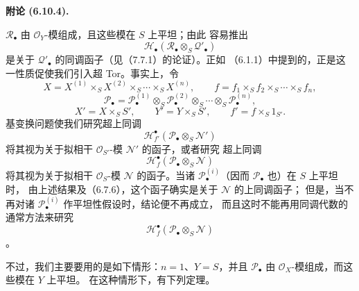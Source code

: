 \documentclass[UTF8,fontset=none,11pt,oneside,openany]{ctexbook}
\newenvironment{scholium}[1][]{%
  \par\medskip\noindent\textbf{附论 (#1).}\ %
}{\par}
\begin{document}
\begin{scholium}[6.10.4]
$\mathscr R_\bullet$ 由 $\mathscr O_Y$-模组成，且这些模在 $S$ 上平坦；由此
容易推出
\[
  \mathscr H_\bullet
  (\mathscr R_\bullet\otimes_S\mathscr Q'_\bullet)
\]
是关于 $\mathscr Q'_\bullet$ 的同调函子（见（7.7.1）的论证）。正如
（6.1.1）中提到的，正是这一性质促使我们引入超 Tor。事实上，令
\[
  X=X^{(1)}\times_SX^{(2)}\times_S\cdots\times_SX^{(n)},
  \qquad
  f=f_1\times_Sf_2\times_S\cdots\times_Sf_n,
\]
\[
  \mathscr P_\bullet
  =
  \mathscr P_\bullet^{(1)}
  \otimes_S\mathscr P_\bullet^{(2)}
  \otimes_S\cdots\otimes_S\mathscr P_\bullet^{(n)},
\]
\[
  X'=X\times_SS',
  \qquad
  Y'=Y\times_SS',
  \qquad
  f'=f\times_S1_{S'}.
\]
基变换问题使我们研究超上同调
\[
  \mathscr H^\bullet_{f'}
  (\mathscr P_\bullet\otimes_S\mathscr N')
\]
将其视为关于拟相干 $\mathscr O_{S'}$-模 $\mathscr N'$ 的函子，或者研究
超上同调
\[
  \mathscr H^\bullet_f
  (\mathscr P_\bullet\otimes_S\mathscr N)
\]
将其视为关于拟相干 $\mathscr O_S$-模 $\mathscr N$ 的函子。当诸
$\mathscr P_\bullet^{(i)}$（因而 $\mathscr P_\bullet$ 也）在 $S$ 上平坦时，
由上述结果及（6.7.6），这个函子确实是关于 $\mathscr N$ 的上同调函子；
但是，当不再对诸 $\mathscr P_\bullet^{(i)}$ 作平坦性假设时，结论便不再成立，
而且这时不能再用同调代数的通常方法来研究
\[
  \mathscr H^\bullet_f
  (\mathscr P_\bullet\otimes_S\mathscr N)
\]
。

不过，我们主要要用的是如下情形：$n=1$、$Y=S$，并且
$\mathscr P_\bullet$ 由 $\mathscr O_X$-模组成，而这些模在 $Y$ 上平坦。
在这种情形下，有下列定理。
\end{scholium}
\end{document}
